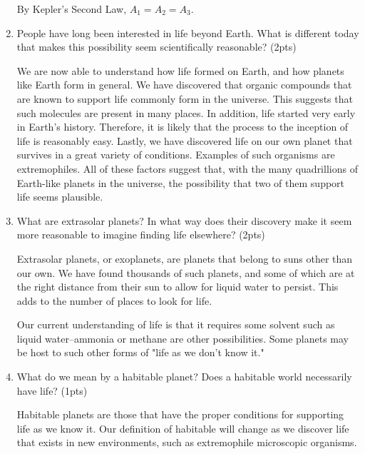 \documentclass{article}
\begin{document}
\begin{enumerate}
\begin{figure*}[ht]
    \end{figure*}

    By Kepler’s Second Law, $A_1=A_2=A_3$.

    \item People have long been interested in life beyond Earth. 
    What is different today that makes this possibility seem scientifically reasonable? (2pts)

    We are now able to understand how life formed on Earth, and how planets like Earth form in general. 
    We have discovered that organic compounds that are known to support life commonly form in the universe. This suggests that such molecules are present in many places. In addition, life started very early in Earth's history. Therefore, it is likely that the process to the inception of life is reasonably easy. Lastly, we have discovered life on our own planet that survives in a great variety of conditions. Examples of such organisms are extremophiles. All of these factors suggest that, with the many quadrillions of Earth-like planets in the universe, the possibility that two of them support life seems plausible.
    
    \item What are extrasolar planets? In what way does their discovery make it seem more reasonable to imagine finding life elsewhere? (2pts)
    
    Extrasolar planets, or exoplanets, are planets that belong to suns other than our own.
    We have found thousands of such planets, and some of which are at the right distance from their sun to allow for liquid water to persist.
    This adds to the number of places to look for life.

    Our current understanding of life is that it requires some solvent such as liquid water--ammonia or methane are other possibilities. Some planets may be host to such other forms of "life as we don't know it."

    \item What do we mean by a habitable planet? Does a habitable world necessarily have life? (1pts)
    
    Habitable planets are those that have the proper conditions for supporting life as we know it. 
    Our definition of habitable will change as we discover life that exists in new environments, such as extremophile microscopic organisms.
    

\end{enumerate}
\end{document}
